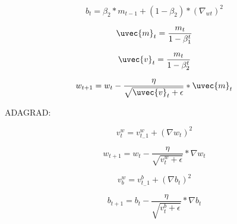     \begin{equation}
    b_t =\beta_2 * m_{t-1} + (1 - \beta_2) * (\nabla_{wt})^2
    \label{ADAM2}
    \end{equation}
            
    \begin{equation}
    \uvec{m}_t = \frac{m_t}{1-\beta^t_1}
    \label{ADAM3}
    \end{equation}
            
    \begin{equation}
    \uvec{v}_t = \frac{m_t}{1-\beta^t_2}
    \label{ADAM4}
    \end{equation}
            
    \begin{equation}
    w_{t+1} = w_t - \frac{\eta}{\sqrt{\uvec{v}_t+\epsilon}}*\uvec{m}_t
    \label{ADAM5}
    \end{equation}
    
    ADAGRAD:
    
    \begin{equation}
    v_t^w = v^w_{t_-1} + (\nabla w_t)^2
    \label{ADAGRAD1}
    \end{equation}
    
    \begin{equation}
    w_{t+1} = w_t - \frac{\eta}{\sqrt{v^w_t+\epsilon}}*\nabla w_t
    \label{ADAGRAD2}
    \end{equation}
    
    \begin{equation}
    v_b^w = v^b_{t_-1} + (\nabla b_t)^2
    \label{ADAGRAD3}
    \end{equation}
    
    \begin{equation}
    b_{t+1} = b_t - \frac{\eta}{\sqrt{v^b_t+\epsilon}}*\nabla b_t 
    \label{ADAGRAD4}
    \end{equation}